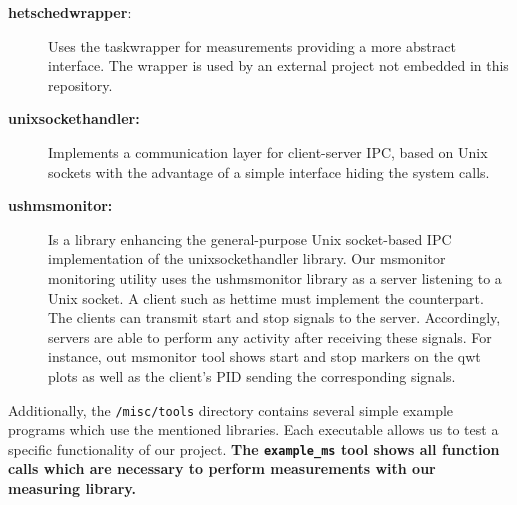 \begin{description}
	\item[\textbf{hetschedwrapper}:] Uses the taskwrapper for measurements providing a more abstract interface. The wrapper is used by an external project not embedded in this repository.
	
	\item[\textbf{unixsockethandler:}] Implements a communication layer for client-server IPC, based on Unix sockets with the advantage of a simple interface hiding the system calls.
	
	\item[\textbf{ushmsmonitor:}] Is a library enhancing the general-purpose Unix socket-based IPC implementation of the unixsockethandler library. Our msmonitor monitoring utility uses the ushmsmonitor library as a server listening to a Unix socket. A client such as hettime must implement the counterpart. The clients can transmit start and stop signals to the server. Accordingly, servers are able to perform any activity after receiving these signals. For instance, out msmonitor tool shows start and stop markers on the qwt plots as well as the client's PID sending the corresponding signals.
\end{description}

Additionally, the \texttt{/misc/tools} directory contains several simple example programs which use the mentioned libraries. Each executable allows us to test a specific functionality of our project. \textbf{The \texttt{example\_ms} tool shows all function calls which are necessary to perform measurements with our measuring library.}
